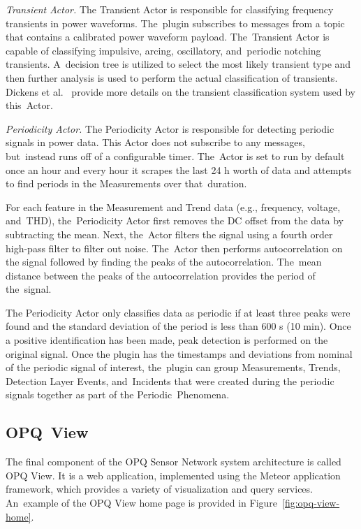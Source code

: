 \documentclass[energies,article,accept,moreauthors,pdftex]{Definitions/mdpi}
\begin{document}
{\em Transient Actor.} The Transient Actor is responsible for classifying frequency transients in power waveforms. The~plugin subscribes to messages from a topic that contains a calibrated power waveform payload. The~Transient Actor is capable of classifying impulsive, arcing, oscillatory, and~periodic notching transients. A~decision tree is utilized to select the most likely transient type and then further analysis is used to perform the actual classification of transients. Dickens et al.~\cite{dickens_transient_2019} provide more details on the transient classification system used by this~Actor.

{\em Periodicity Actor.} The Periodicity Actor is responsible for detecting periodic signals in power data. This Actor does not subscribe to any messages, but~instead runs off of a configurable timer. The~Actor is set to run by default once an hour and every hour it scrapes the last 24 h worth of data and attempts to find periods in the Measurements over that~duration.

For each feature in the Measurement and Trend data (e.g., frequency, voltage, and~THD), the~Periodicity Actor first removes the DC offset from the data by subtracting the mean. Next, the~Actor filters the signal using a fourth order high-pass filter to filter out noise. The~Actor then performs autocorrelation on the signal followed by finding the peaks of the autocorrelation. The~mean distance between the peaks of the autocorrelation provides the period of the~signal.

The Periodicity Actor only classifies data as periodic if at least three peaks were found and the standard deviation of the period is less than 600 s (10 min). Once a positive identification has been made, peak detection is performed on the original signal. Once the plugin has the timestamps and deviations from nominal of the periodic signal of interest, the~plugin can group Measurements, Trends, Detection Layer Events, and~Incidents that were created during the periodic signals together as part of the Periodic~Phenomena.

\subsection{OPQ~View}
\label{sec:opq-view}

The final component of the OPQ Sensor Network system architecture is called OPQ View. It is a web application, implemented using the Meteor application framework, which provides a variety of visualization and query services. An~example of the OPQ View home page is provided in Figure~\ref{fig:opq-view-home}.
\end{document}
